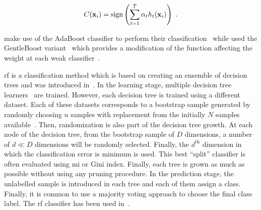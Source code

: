 \begin{equation}
	C(\mathbf{x}_i) = \operatorname*{sign} \left( \sum_{t=1}^{T} \alpha_t h_t(\mathbf{x}_i) \right) \ .
	\label{eq:strclaada}
\end{equation}

\citeauthor{Lopes2011} make use of the AdaBoost classifier to perform their classification~\cite{Lopes2011} while \citeauthor{Litjens2014} used the GentleBoost variant~\cite{Friedman1998} which provides a modification of the function affecting the weight at each weak classifier~\cite{Litjens2014}.

\Ac{rf} is a classification method which is based on creating an ensemble of decision trees and was introduced in~\cite{Breiman2001}.
In the learning stage, multiple decision tree learners~\cite{Breiman1984} are trained.
However, each decision tree is trained using a different dataset.
Each of these datasets corresponds to a bootstrap sample generated by randomly choosing $n$ samples with replacement from the initially $N$ samples available~\cite{Efron1979}.
Then, randomization is also part of the decision tree growth.
At each node of the decision tree, from the bootstrap sample of $D$ dimensions, a number of $d \ll D$ dimensions will be randomly selected.
Finally, the $d^{\text{th}}$ dimension in which the classification error is minimum is used.
This best ``split'' classifier is often evaluated using \ac{mi} or Gini index.
Finally, each tree is grown as much as possible without using any pruning procedure.
In the prediction stage, the unlabelled sample is introduced in each tree and each of them assign a class.
Finally, it is common to use a majority voting approach to choose the final class label.
The \ac{rf} classifier has been used in~\cite{Kelm2007,Litjens2014,Tiwari2012,Tiwari2013,Viswanath2009,trigui2017automatic,trigui2016classification,samarasinghe2016semi,rampun2015classifying,rampun2016computerb,rampun2015computer,rampun2016computer}.

